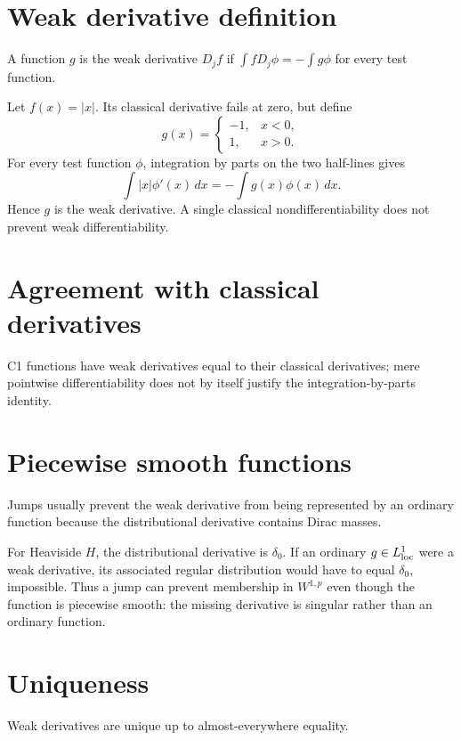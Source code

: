 \section{Weak derivative definition}
A function $g$ is the weak derivative $D_jf$ if $\int fD_j\phi=-\int g\phi$ for every test function.


\begin{example}\label{ex:iii20-expand-01}
Let \(f(x)=|x|\). Its classical derivative fails at zero, but define
\[
g(x)=
\begin{cases}
-1,&x<0,\\
1,&x>0.
\end{cases}
\]
For every test function \(\phi\), integration by parts on the two half-lines
gives
\[
\int |x|\phi'(x)\,dx=-\int g(x)\phi(x)\,dx.
\]
Hence \(g\) is the weak derivative. A single classical nondifferentiability
does not prevent weak differentiability.
\end{example}
\section{Agreement with classical derivatives}
C1 functions have weak derivatives equal to their classical derivatives; mere pointwise differentiability does not by itself justify the integration-by-parts identity.

\section{Piecewise smooth functions}
Jumps usually prevent the weak derivative from being represented by an ordinary function because the distributional derivative contains Dirac masses.


\begin{example}\label{ex:iii20-expand-02}
For Heaviside \(H\), the distributional derivative is \(\delta_0\). If an
ordinary \(g\in L^1_{\rm loc}\) were a weak derivative, its associated regular
distribution would have to equal \(\delta_0\), impossible. Thus a jump can
prevent membership in \(W^{1,p}\) even though the function is piecewise smooth:
the missing derivative is singular rather than an ordinary function.
\end{example}
\section{Uniqueness}
Weak derivatives are unique up to almost-everywhere equality.

